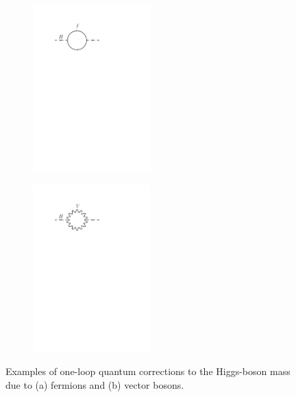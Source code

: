 \begin{figure}[htb!]
\begin{subfigure}{0.5\textwidth}
  \centering
  \includegraphics[width=0.5\textwidth]{figures/Theory/loopFermion.pdf}
  \caption{}
  \label{fig:theo:higgscorrectionloopfermion}
\end{subfigure}
\begin{subfigure}{0.5\textwidth}
  \centering
  \includegraphics[width=0.5\textwidth]{figures/Theory/loopBoson.pdf}
  \caption{}
  \label{fig:theo:higgscorrectionloopboson}
\end{subfigure}

\captionsetup{width=0.85\textwidth} \caption{\small Examples of one-loop quantum corrections to the Higgs-boson mass due to (a) fermions and (b) vector bosons.}
\label{fig:theo:higgsmasscorr}
\end{figure}
